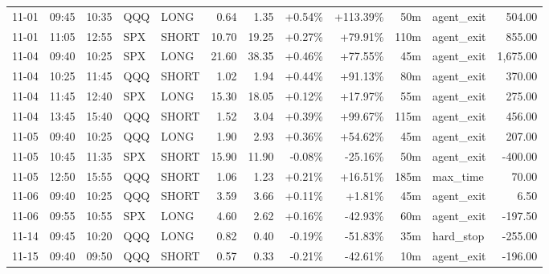 \documentclass[11pt,a4paper,twoside]{article}
\begin{document}
\begin{center}
\begin{longtable}{>{\color{txtmain}}l l l l l r r r r r >{\color{txtmain}}l r}
11-01 & 09:45 & 10:35 & QQQ & LONG & 0.64 & 1.35 & \textcolor{wingreen}{+0.54\%} & \textcolor{wingreen}{+113.39\%} & 50m & agent\_exit & \textcolor{wingreen}{504.00} \\
11-01 & 11:05 & 12:55 & SPX & SHORT & 10.70 & 19.25 & \textcolor{wingreen}{+0.27\%} & \textcolor{wingreen}{+79.91\%} & 110m & agent\_exit & \textcolor{wingreen}{855.00} \\
11-04 & 09:40 & 10:25 & SPX & LONG & 21.60 & 38.35 & \textcolor{wingreen}{+0.46\%} & \textcolor{wingreen}{+77.55\%} & 45m & agent\_exit & \textcolor{wingreen}{1,675.00} \\
11-04 & 10:25 & 11:45 & QQQ & SHORT & 1.02 & 1.94 & \textcolor{wingreen}{+0.44\%} & \textcolor{wingreen}{+91.13\%} & 80m & agent\_exit & \textcolor{wingreen}{370.00} \\
11-04 & 11:45 & 12:40 & SPX & LONG & 15.30 & 18.05 & \textcolor{wingreen}{+0.12\%} & \textcolor{wingreen}{+17.97\%} & 55m & agent\_exit & \textcolor{wingreen}{275.00} \\
11-04 & 13:45 & 15:40 & QQQ & SHORT & 1.52 & 3.04 & \textcolor{wingreen}{+0.39\%} & \textcolor{wingreen}{+99.67\%} & 115m & agent\_exit & \textcolor{wingreen}{456.00} \\
11-05 & 09:40 & 10:25 & QQQ & LONG & 1.90 & 2.93 & \textcolor{wingreen}{+0.36\%} & \textcolor{wingreen}{+54.62\%} & 45m & agent\_exit & \textcolor{wingreen}{207.00} \\
11-05 & 10:45 & 11:35 & SPX & SHORT & 15.90 & 11.90 & \textcolor{lossred}{-0.08\%} & \textcolor{lossred}{-25.16\%} & 50m & agent\_exit & \textcolor{lossred}{-400.00} \\
11-05 & 12:50 & 15:55 & QQQ & SHORT & 1.06 & 1.23 & \textcolor{wingreen}{+0.21\%} & \textcolor{wingreen}{+16.51\%} & 185m & max\_time & \textcolor{wingreen}{70.00} \\
11-06 & 09:40 & 10:25 & QQQ & SHORT & 3.59 & 3.66 & \textcolor{wingreen}{+0.11\%} & \textcolor{wingreen}{+1.81\%} & 45m & agent\_exit & \textcolor{wingreen}{6.50} \\
11-06 & 09:55 & 10:55 & SPX & LONG & 4.60 & 2.62 & \textcolor{wingreen}{+0.16\%} & \textcolor{lossred}{-42.93\%} & 60m & agent\_exit & \textcolor{lossred}{-197.50} \\
11-14 & 09:45 & 10:20 & QQQ & LONG & 0.82 & 0.40 & \textcolor{lossred}{-0.19\%} & \textcolor{lossred}{-51.83\%} & 35m & hard\_stop & \textcolor{lossred}{-255.00} \\
11-15 & 09:40 & 09:50 & QQQ & SHORT & 0.57 & 0.33 & \textcolor{lossred}{-0.21\%} & \textcolor{lossred}{-42.61\%} & 10m & agent\_exit & \textcolor{lossred}{-196.00} \\

\end{longtable}
\end{center}
\end{document}

